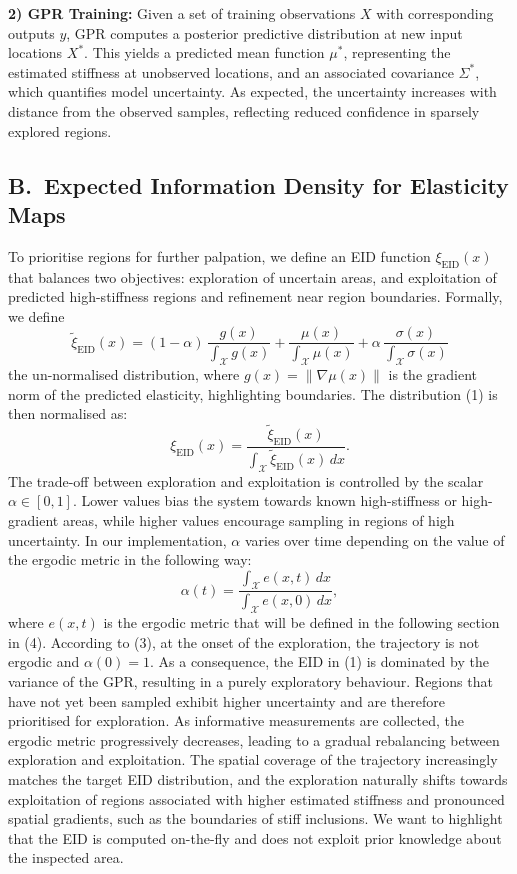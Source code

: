 \documentclass[11pt]{article}
\begin{document}
\textbf{2) GPR Training:} Given a set of training observations $X$
with corresponding outputs $y$, GPR computes a posterior predictive
distribution at new input locations $X^{*}$. This yields a predicted
mean function $\mu^{*}$, representing the estimated stiffness at
unobserved locations, and an associated covariance $\Sigma^{*}$,
which quantifies model uncertainty. As expected, the uncertainty
increases with distance from the observed samples, reflecting
reduced confidence in sparsely explored regions.

\subsection*{B.\ Expected Information Density for Elasticity Maps}

To prioritise regions for further palpation, we define an EID
function $\xi_{\mathrm{EID}}(x)$ that balances two objectives:
exploration of uncertain areas, and exploitation of predicted
high-stiffness regions and refinement near region boundaries.
Formally, we define
\begin{equation}
\tilde{\xi}_{\mathrm{EID}}(x) =
(1 - \alpha)\,\frac{g(x)}{\int_{\mathcal{X}} g(x)}
+ \frac{\mu(x)}{\int_{\mathcal{X}} \mu(x)}
+ \alpha\,\frac{\sigma(x)}{\int_{\mathcal{X}} \sigma(x)}
\end{equation}
the un-normalised distribution, where
$g(x) = \|\nabla \mu(x)\|$ is the gradient norm of the predicted
elasticity, highlighting boundaries. The distribution (1) is then
normalised as:
\begin{equation}
\xi_{\mathrm{EID}}(x) =
\frac{\tilde{\xi}_{\mathrm{EID}}(x)}%
{\int_{\mathcal{X}} \tilde{\xi}_{\mathrm{EID}}(x)\, dx}.
\end{equation}
The trade-off between exploration and exploitation is controlled by
the scalar $\alpha \in [0, 1]$. Lower values bias the system towards
known high-stiffness or high-gradient areas, while higher values
encourage sampling in regions of high uncertainty. In our
implementation, $\alpha$ varies over time depending on the value of
the ergodic metric in the following way:
\begin{equation}
\alpha(t) =
\frac{\int_{\mathcal{X}} e(x, t)\, dx}%
{\int_{\mathcal{X}} e(x, 0)\, dx},
\end{equation}
where $e(x, t)$ is the ergodic metric that will be defined in the
following section in (4). According to (3), at the onset of the
exploration, the trajectory is not ergodic and $\alpha(0) = 1$. As a
consequence, the EID in (1) is dominated by the variance of the GPR,
resulting in a purely exploratory behaviour. Regions that have not
yet been sampled exhibit higher uncertainty and are therefore
prioritised for exploration. As informative measurements are
collected, the ergodic metric progressively decreases, leading to a
gradual rebalancing between exploration and exploitation. The
spatial coverage of the trajectory increasingly matches the target
EID distribution, and the exploration naturally shifts towards
exploitation of regions associated with higher estimated stiffness
and pronounced spatial gradients, such as the boundaries of stiff
inclusions. We want to highlight that the EID is computed on-the-fly
and does not exploit prior knowledge about the inspected area.
\end{document}
